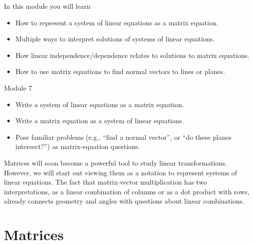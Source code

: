 \begin{module}

	In this module you will learn
	\begin{itemize}
		\item How to represent a system of linear equations as a matrix equation.
		\item Multiple ways to interpret solutions of systems of linear equations.
		\item How linear independence/dependence relates to solutions to matrix equations.
		\item How to use matrix equations to find normal vectors to lines or planes.
	\end{itemize}

	
	
\end{module}
\begin{lesson}

	Module 7

	\begin{itemize}
		\item Write a system of linear equations as a matrix equation.
		\item Write a matrix equation as a system of linear equations.
		\item Pose familiar problems (e.g., ``find a normal vector'', or
			``do these planes intersect\mbox{?}'') as matrix-equation
			questions.
	\end{itemize}

	Matrices will soon become a powerful tool to study linear transformations.
	However, we will start out viewing them as a notation to represent
	systems of linear equations. The fact that matrix-vector multiplication
	has two interpretations, as a linear combination of columns or as a dot product
	with rows, already connects geometry and angles with questions about linear combinations.

\end{lesson}
	\bookonlynewpage
\section*{Matrices}

